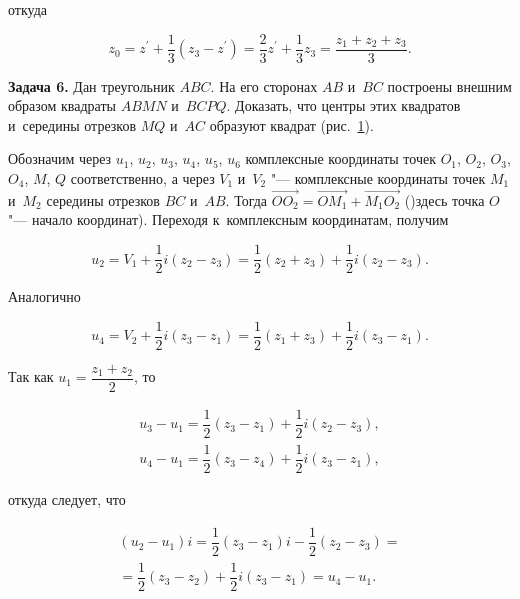 \noindent
откуда

\begin{equation*}
	z_{0} = z^\prime + \dfrac{1}{3} \left( z_{3} - z^\prime \right) =
	\dfrac{2}{3}z^\prime + \dfrac{1}{3}z_{3} = 
	\dfrac{z_{1} + z_{2} + z_{3}}{3}.
\end{equation*}

\textbf{Задача 6.}\label{ex:7_2_6} Дан треугольник $ABC$. На его сторонах
$AB$ и~$BC$ построены внешним образом квадраты $ABMN$ и~$BCPQ$.
Доказать, что центры этих квадратов и~середины отрезков $MQ$ и~$AC$
образуют квадрат (рис.\ \ref{fig:7_2_19}).

\begin{figure}\label{fig:7_2_19}
\end{figure}

Обозначим через $u_{1}$, $u_{2}$, $u_{3}$, $u_{4}$, $u_{5}$, $u_{6}$ 
комплексные координаты точек $O_{1}$, $O_{2}$, $O_{3}$, $O_{4}$, $M$, $Q$ 
соответственно, а через $V_{1}$ и~$V_{2}$ "--- комплексные координаты точек
$M_{1}$ и~$M_{2}$ середины отрезков $BC$ и~$AB$. Тогда
$\overrightarrow{OO_{2}} = \overrightarrow{OM_{1}} + \overrightarrow{M_{1}O_{2}}$
()здесь точка $O$ "--- начало координат). Переходя к~комплексным координатам,
получим

\begin{equation*}
u_{2} = V_{1} + \dfrac{1}{2} i (z_{2} - z_{3}) =
	\dfrac{1}{2}(z_{2} + z_{3}) + \dfrac{1}{2} i (z_{2} - z_{3}).
\end{equation*}

\noindent
Аналогично

\begin{equation*}
u_{4} = V_{2} + \dfrac{1}{2} i (z_{3} - z_{1}) =
	\dfrac{1}{2}(z_{1} + z_{3}) + \dfrac{1}{2} i (z_{3} - z_{1}).
\end{equation*}

Так как $u_{1} = \dfrac{z_{1} + z_{2}}{2}$, то

\begin{gather*}
u_{3} - u_{1} = \dfrac{1}{2}(z_{3} - z_{1}) + \dfrac{1}{2}i(z_{2} - z_{3}), \\
u_{4} - u_{1} = \dfrac{1}{2}(z_{3} - z_{4}) + \dfrac{1}{2}i(z_{3} - z_{1}),
\end{gather*}

откуда следует, что

\begin{multline*}
(u_{2} - u_{1})i =
\dfrac{1}{2}(z_{3} - z_{1})i - \dfrac{1}{2}(z_{2} - z_{3}) = \\
= \dfrac{1}{2}(z_{3} - z_{2}) + \dfrac{1}{2}i(z_{3} - z_{1}) =
u_{4} - u_{1}.
\end{multline*}


